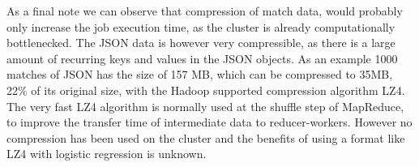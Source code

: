 As a final note we can observe that compression of match data, would probably only increase the job execution time, as the cluster is already computationally bottlenecked. The JSON data is however very compressible, as there is a large amount of recurring keys and values in the JSON objects. As an example 1000 matches of JSON has the size of 157 MB, which can be compressed to 35MB, 22\% of its original size, with the Hadoop supported compression algorithm LZ4. The very fast LZ4 algorithm is normally used at the shuffle step of MapReduce, to improve the transfer time of intermediate data to reducer-workers. However no compression has been used on the cluster and the benefits of using a format like LZ4 with logistic regression is unknown.

%


